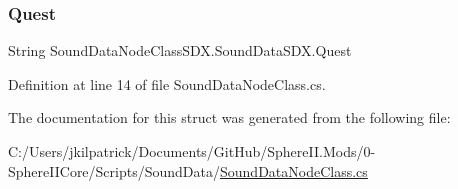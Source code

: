 \mbox{\label{struct_sound_data_node_class_s_d_x_1_1_sound_data_s_d_x_a108ecf85c3cb78a62257553a65080aeb}} 
\subsubsection{\texorpdfstring{Quest}{Quest}}
{\footnotesize\ttfamily String Sound\+Data\+Node\+Class\+S\+D\+X.\+Sound\+Data\+S\+D\+X.\+Quest}



Definition at line 14 of file Sound\+Data\+Node\+Class.\+cs.



The documentation for this struct was generated from the following file\+:\begin{DoxyCompactItemize}
\item 
C\+:/\+Users/jkilpatrick/\+Documents/\+Git\+Hub/\+Sphere\+I\+I.\+Mods/0-\/\+Sphere\+I\+I\+Core/\+Scripts/\+Sound\+Data/\mbox{\hyperlink{_sound_data_node_class_8cs}{Sound\+Data\+Node\+Class.\+cs}}\end{DoxyCompactItemize}
